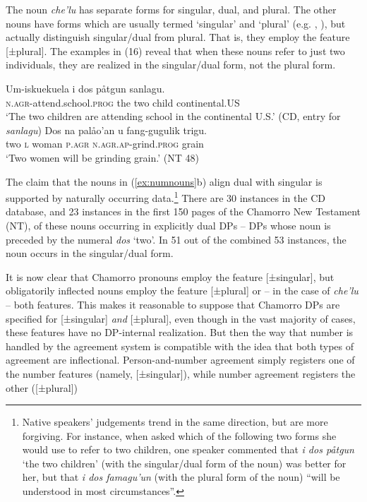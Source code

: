 \documentclass[output=paper,
modfonts
]{LSP/langsci}
\begin{document}
\begin{exe}
\begin{xlist}
The noun \emph{che'lu} has separate forms for singular, dual, and
plural. The other nouns have forms which are usually termed `singular'
and `plural' (e.g. \citealt[302--304]{safford1903}, \citealt[325]{topping1973}),
but actually distinguish singular/dual from plural. That is, they employ
the feature {[}±plural{]}. The examples in (16) reveal that when these
nouns refer to just two individuals, they are realized in the
singular/dual form, not the plural form.

\ea
\ea
\gll  Um-iskuekuela i dos påtgun sanlagu.\\
\textsc{n.agr-}attend.school.\textsc{prog} the two child continental.US\\
\glt `The two children are attending school in the continental U.S.' (CD,
entry for \emph{sanlagu})
\ex \gll Dos na palåo'an u fang-gugulik trigu.\\
two \textsc{l} woman \textsc{p.agr} \textsc{n.agr.ap-}grind.\textsc{prog} grain\\
\glt `Two women will be grinding grain.' (NT 48)
\z
\z

The claim that the nouns in (\ref{ex:numnouns}b) align dual with singular is supported
by naturally occurring data.\footnote{Native speakers' judgements trend
  in the same direction, but are more forgiving. For instance, when
  asked which of the following two forms she would use to refer to two
  children, one speaker commented that \emph{i dos påtgun} `the two
  children' (with the singular/dual form of the noun) was better for
  her, but that \emph{i dos famagu'un} (with the plural form of the
  noun) ``will be understood in most circumstances''.} There are 30
instances in the CD database, and 23 instances in the first 150 pages of
the Chamorro New Testament (NT), of these nouns occurring in explicitly
dual DPs -- DPs whose noun is preceded by the numeral \emph{dos} `two'.
In 51 out of the combined 53 instances, the noun occurs in the
singular/dual form.

It is now clear that Chamorro pronouns employ the feature
{[}±singular{]}, but obligatorily inflected nouns employ the feature
{[}±plural{]} or -- in the case of \emph{che'lu} -- both features. This
makes it reasonable to suppose that Chamorro DPs are specified for
{[}±singular{]} \emph{and} {[}±plural{]}, even though in the vast
majority of cases, these features have no DP-internal realization. But
then the way that number is handled by the agreement system is
compatible with the idea that both types of agreement are inflectional.
Person-and-number agreement simply registers one of the number features
(namely, {[}±singular{]}), while number agreement registers the other
({[}±plural{]})


\end{xlist}
\end{exe}
\end{document}
